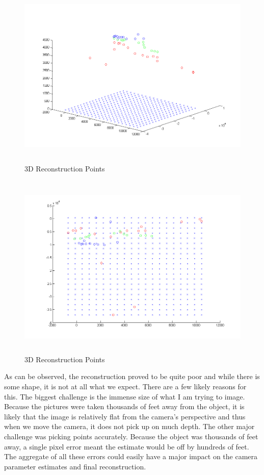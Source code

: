 \documentclass[11pt,psfig]{article}
\begin{document}
\begin{figure}[H]
\centering
\includegraphics[height=3.5in]{sfmResults1/triangulationAttempt3.png}
\caption{3D Reconstruction Points}
\end{figure}
\begin{figure}[H]
\centering
\includegraphics[height=3.5in]{sfmResults1/triangulationAttempt4.png}
\caption{3D Reconstruction Points}
\end{figure}

As can be observed, the reconstruction proved to be quite poor and while there is some shape, it is not at all what we expect. There are a few likely reasons for this. The biggest challenge is the immense size of what I am trying to image. Because the pictures were taken thousands of feet away from the object, it is likely that the image is relatively flat from the camera's perspective and thus when we move the camera, it does not pick up on much depth. The other major challenge was picking points accurately. Because the object was thousands of feet away, a single pixel error meant the estimate would be off by hundreds of feet. The aggregate of all these errors could easily have a major impact on the camera parameter estimates and final reconstruction. 
\end{document}
